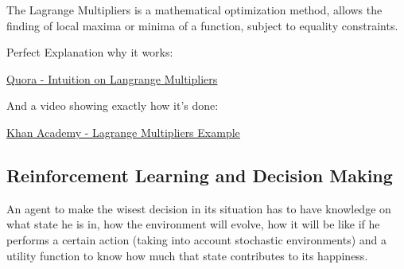 The Lagrange Multipliers is a mathematical optimization method, allows the finding of local maxima or minima of a function, subject to equality constraints.

Perfect Explanation why it works:

\href{https://www.quora.com/Why-does-the-method-of-Lagrange-multipliers-work-for-optimization-in-multivariable-calculus-Why-exactly-given-a-function-f-x-y-and-a-constraint-g-x-y-c-can-we-set-the-gradients-of-the-functions-to-be-multiples-of-each-other}{\ul{Quora - Intuition on Langrange Multipliers}}

And a video showing exactly how it's done:

\href{https://www.youtube.com/watch?v=yuqB-d5MjZA}{\ul{Khan Academy - Lagrange Multipliers Example}}



\subsection{Reinforcement Learning and Decision Making}


An agent to make the wisest decision in its situation has to have knowledge on what state he is in, how the environment will evolve, how it will be like if he performs a certain action (taking into account stochastic environments) and a utility function to  know how much that state contributes to its happiness.


